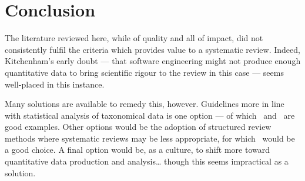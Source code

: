 \section{Conclusion}

The literature reviewed here, while of quality and all of impact, did not consistently fulfil the criteria which provides value to a systematic review. Indeed, Kitchenham's early doubt --- that software engineering might not produce enough quantitative data to bring scientific rigour to the review in this case --- seems well-placed in this instance.\par

Many solutions are available to remedy this, however. Guidelines more in line with statistical analysis of taxonomical data is one option --- of which~\cite{Kitchenham2013} and~\cite{Kampenes2007} are good examples. Other options would be the adoption of structured review methods where systematic reviews may be less appropriate, for which~\cite{Webster2002} would be a good choice. A final option would be, as a culture, to shift more toward quantitative data production and analysis\dots{} though this seems impractical as a solution.\par







